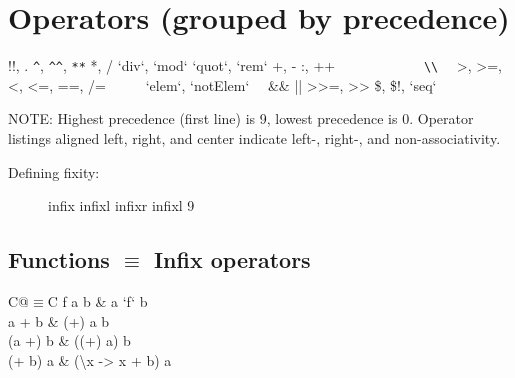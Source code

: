 \documentclass{refcard}
\newcommand{\la}{\textbackslash}
\begin{document}
\section{Operators (grouped by precedence)}

\begin{Ldesc}
	 !!, \hfill .
	 \hfill \verb+^+, \verb+^^+, \verb+**+
	 *, /
	 `div`, `mod`
	 `quot`, `rem`
	 +, -
	 \hfill :, ++
	                 ~~~~~~~~~~~~\verb+\\+
	\Li[comparisons:]     ~~>, >=, <, <=, ==, /=~~
	  ~~~`elem`, `notElem`~~
	 \hfill \&\&
	\Li[boolean or] \hfill ||
	 >>=, >>
	 \$, \$!, `seq`
\end{Ldesc}

\noindent
NOTE: Highest precedence (first line) is 9, lowest precedence is 0.  Operator
listings aligned left, right, and center indicate left-, right-, and
non-associativity.



\begin{description}
\item [Defining fixity:]
\begin{ldesc}
	 infix  
	 infixl  \I{+--+}
	 infixr  \I{-!-}
	 infixl 9
\end{ldesc}
\end{description}

\subsection{Functions $\equiv$ Infix operators}

\begin{tabular}{C@{\s$\equiv$\s}C}
	f a b & a `f` b \\
	a + b & (+) a b \\
	(a +) b & ((+) a) b \\
	(+ b) a & (\la{}x -> x + b) a \\
\end{tabular}
\end{document}
